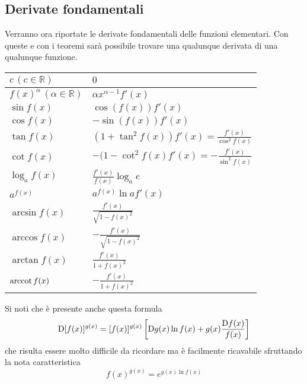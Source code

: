 \subsection{Derivate fondamentali}
Verranno ora riportate le derivate fondamentali delle funzioni elementari. Con queste e con i
teoremi sarà possibile trovare una qualunque derivata di una qualunque funzione.
\tablelasttail{\bottomrule}
\begin{center}
  \begin{xtabular}{M{2cm} M{5cm}}
    $c\,(c\in\mathbb{R})$ & $0$\\ \midrule
    $f(x)^\alpha\, (\alpha\in\mathbb{R})$ & $\alpha x^{\alpha-1}f'(x)$\\ \midrule
    $\sin f(x)$ & $\cos(f(x))f'(x)$\\ \midrule
    $\cos f(x)$ & $-\sin(f(x))f'(x)$\\ \midrule
    $\tan f(x)$ & $(1+\tan^2 f(x))f'(x)=\frac{f'(x)}{\cos^2f(x)}$\\ \midrule
    $\cot f(x)$ & $-(1-\cot^2f(x)f'(x)=-\frac{f'(x)}{\sin^2f(x)}$\\ \midrule
    $\log_a f(x)$ & $\frac{f'(x)}{f(x)}\log_a e$\\ \midrule
    $a^{f(x)}$ & $a^{f(x)}\ln af'(x)$\\ \midrule
    $\arcsin f(x)$ & $\frac{f'(x)}{\sqrt{1-f(x)^2}}$\\ \midrule
    $\arccos f(x)$ & $-\frac{f'(x)}{\sqrt{1-f(x)^2}}$\\ \midrule
    $\arctan f(x)$ & $\frac{f'(x)}{1+f(x)^2}$\\ \midrule
    $\operatorname{arccot} f(x)$ & $-\frac{f'(x)}{1+f(x)^2}$\\
  \end{xtabular}
\end{center}
Si noti che è presente anche questa formula
\begin{equation*}
  \mathop{}\!\mathrm{D}[f(x)]^{g(x)}=[f(x)]^{g(x)} \left[ \mathop{}\!\mathrm{D} g(x)\ln f(x)+g(x) \frac{\mathop{}\!\mathrm{D} f(x)}{f(x)} \right]
\end{equation*}
che risulta essere molto difficile da ricordare ma è facilmente ricavabile sfruttando la nota
caratteristica
\begin{equation*}
  f(x)^{g(x)} = e^{g(x)\ln f(x)}
\end{equation*}

